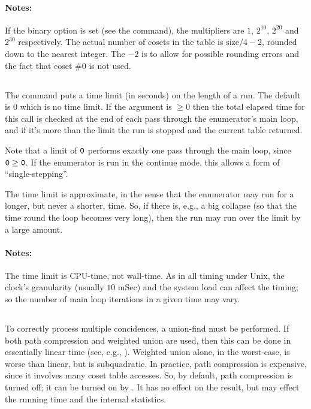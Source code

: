 \paragraph{Notes:}
If the binary option is set (see the  command), the multipliers
  are $1$, $2^{10}$\kern-2pt, $2^{20}$ and $2^{30}$ respectively.
The actual number of cosets in the table is $\mathrm{size}/4 -2$, rounded
  down to the nearest integer.
The $-2$ is to allow for possible rounding errors and the fact that coset
  \#0 is not used.

\subsection{}
\label{cmd:time limit}
The  command puts a time limit (in seconds) on the length of a run.
The default is 0 which is no time limit.
If the argument is $\ge0$ then the total elapsed time for this call is
checked at the end of each pass through the enumerator's main loop, and
if it's more than the limit the run is stopped and the current table
returned.

Note that a limit of $\texttt{0}$ performs exactly one pass through the main
  loop, since $\texttt{0} \ge \texttt{0}$.
If the enumerator is run in the continue mode, this allows a form of
  ``single-stepping''\kern-1.5pt.

The time limit is approximate, in the sense that the enumerator may run for
a longer, but never a shorter, time.  So, if there is, e.g., a big collapse
(so that the time round the loop becomes very long), then the run may run
over the limit by a large amount.

\paragraph{Notes:}
The time limit is CPU-time, not wall-time.
As in all timing under Unix, the clock's granularity (usually $10$ mSec)
  and the system load can affect the timing; so the number of main loop
  iterations in a given time may vary.

\subsection{}
\label{cmd:path compression}
To correctly process multiple concidences, a union-find must be performed.
If both path compression and weighted union are used, then this can be
  done in essentially linear time (see, e.g., \cite{CLR}).
Weighted union alone, in the worst-case, is worse than linear, but is
  subquadratic.
In practice, path compression is expensive, since it involves many coset
  table accesses.
So, by default, path compression is turned off; it can be turned on by
  .
It has no effect on the result, but may effect the running time and the
  internal statistics.

